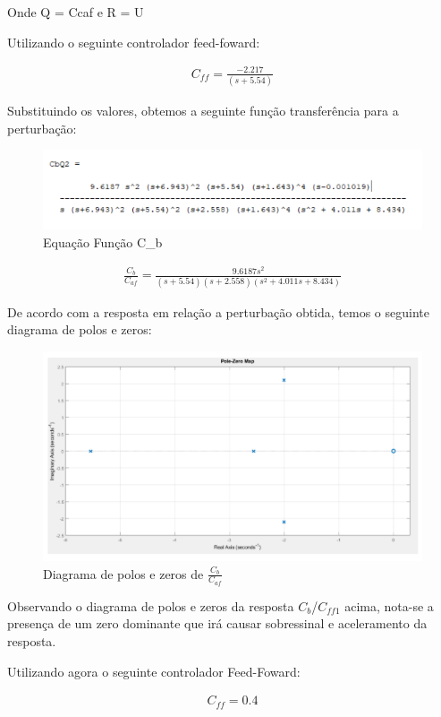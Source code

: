 \documentclass[a4paper,12pt]{article}
\begin{document}
Onde Q = Ccaf e R = U

Utilizando o seguinte controlador feed-foward:

\begin{align}
C_{ff} = \frac{-2.217}{(s+5.54)} 
\end{align}


Substituindo os valores, obtemos a seguinte função transferência para a perturbação:

\begin{figure} [H]
    \centering
    \includegraphics[width=0.8\linewidth]{image16.png}
    \caption{Equação Função C_b}    
\end{figure}

\begin{align}
\frac{C_b}{C_{af}} = \frac{9.6187s^2}{(s+5.54)(s+2.558)(s^2+4.011s+8.434)}
\end{align}

De acordo com a resposta em relação a perturbação obtida, temos o seguinte diagrama de polos e zeros:

\begin{figure}[H]
    \centering
    \includegraphics[width=0.8\linewidth]{image17.png}
    \caption{Diagrama de polos e zeros de \( \frac{C_b}{C_{af}} \)}
\end{figure}

Observando o diagrama de polos e zeros da resposta \(C_b\)/\(C_{ff1}\) acima, nota-se a presença de um zero dominante que irá causar sobressinal e aceleramento da resposta.

Utilizando agora o seguinte controlador Feed-Foward:

\begin{align}
C_{ff} = 0.4
\end{align}
\end{document}
